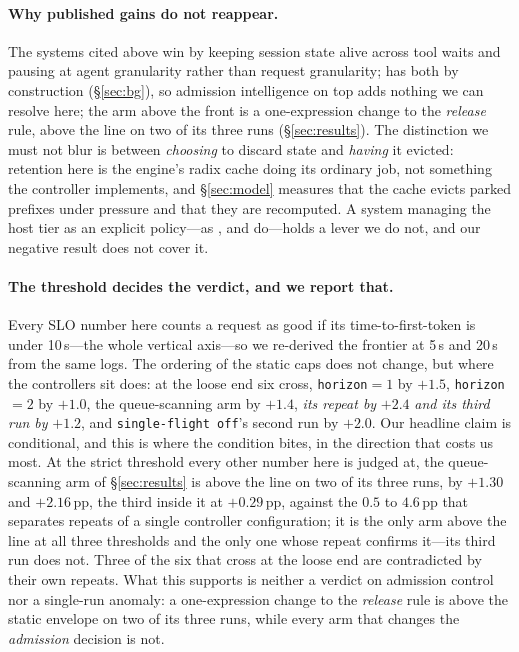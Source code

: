 \paragraph{Why published gains do not reappear.} The systems cited above win by keeping session state alive across tool waits and pausing at agent granularity rather than request granularity; \sys{} has both by construction (\S\ref{sec:bg}), so admission intelligence on top adds nothing we can resolve here; the arm above the front is a one-expression change to the \emph{release} rule, above the line on two of its three runs
(\S\ref{sec:results}). The distinction we must not blur is between \emph{choosing} to discard state and \emph{having} it evicted: retention here is the engine's radix cache doing its ordinary job, not something the controller implements, and \S\ref{sec:model} measures that the cache evicts parked prefixes
under pressure and that they are recomputed. A system managing the host tier as an explicit policy---as \cite{mori}, \cite{flexgen} and \cite{yu2025pensieve} do---holds a lever we do not, and our negative result does not cover it.

\paragraph{The threshold decides the verdict, and we report that.} Every SLO number
here counts a request as good if its time-to-first-token is under 10\,s---the whole
vertical axis---so we re-derived the frontier at 5\,s and 20\,s from the same logs. The ordering of the static caps does not change, but where the
controllers sit does: at the loose end six cross, \texttt{horizon}$=1$ by $+1.5$,
\texttt{horizon}$=2$ by $+1.0$, the queue-scanning arm by $+1.4$, \emph{its repeat
by} $+2.4$ \emph{and its third run by} $+1.2$, and \texttt{single-flight off}'s
second run by $+2.0$. Our
headline claim is conditional, and this is where the condition bites, in the
direction that costs us most. At the strict threshold every other number here is
judged at, the queue-scanning arm of \S\ref{sec:results} is above the line on
two of its three runs, by $+1.30$ and $+2.16$\,pp, the third inside it at
$+0.29$\,pp, against the $0.5$ to $4.6$\,pp that separates repeats of a single
controller configuration; it is the only arm above the line at all three
thresholds and the only one whose repeat confirms it---its third run does not. Three of the six that cross
at the loose end are contradicted by their own repeats. What this supports is neither a verdict on
admission control nor a single-run anomaly: a one-expression change
to the \emph{release} rule is above the static envelope on two of its three runs, while
every arm that changes the \emph{admission} decision is not.

